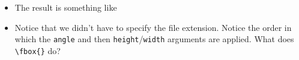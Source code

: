 \begin{itemize}
\item The result is something like
  \begin{center}
  \end{center}

\item Notice that we didn't have to specify the file extension. Notice
  the order in which the \texttt{angle} and then
  \texttt{height}/\texttt{width} arguments are applied. What does
  \verb!\fbox{}! do?


\end{itemize}

